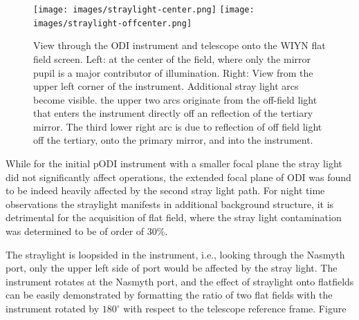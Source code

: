 \documentclass[]{spieman}
\begin{document}
\begin{figure}[h]
	\texttt{[image: images/straylight-center.png]}
	\texttt{[image: images/straylight-offcenter.png]}
	\caption{\label{fig_straylight} View through the ODI instrument and 
	telescope
	onto the WIYN flat field screen. Left: at the center of the field, where 
	only
	the mirror pupil is a major contributor of illumination. Right: View from 
	the
	upper left corner of the instrument. Additional stray light arcs become
	visible. the upper two arcs originate from the off-field light that enters 
	the
	instrument directly off an reflection of the tertiary mirror. The third 
	lower
	right arc is due to reflection of off field light off the tertiary, onto the
	primary mirror, and  into the instrument. }
\end{figure}


While for the initial pODI instrument with a smaller focal plane the stray
light did not significantly affect operations, the extended focal plane of
ODI was found to be indeed heavily affected by the second stray light path.
For night time observations the straylight manifests in additional
background structure, it is detrimental for the acquisition of flat field,
where the stray light contamination was determined to be of order of 30\%.

The straylight is loopsided in the instrument, i.e., looking through the
Nasmyth port, only the upper left side of port would be affected by the
stray light. The instrument rotates at the Nasmyth port, and the effect of
straylight onto flatfields can be easily demonstrated by formatting the ratio
of two flat fields with the instrument rotated by $180^\circ$ with respect
to the telescope reference frame. Figure \label{fig_flatfieldbaffle}
\end{document}
